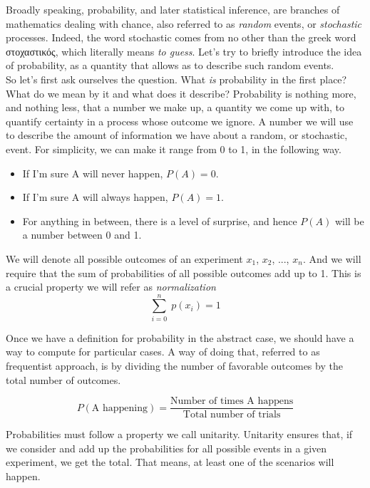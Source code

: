 \documentclass{book}
\begin{document}
Broadly speaking, probability, and later statistical inference, are branches of mathematics dealing with chance, also referred to as \textit{random} events, or \textit{stochastic} processes. Indeed, the word stochastic comes from no other than the greek word \textgreek{στοχαστικός}, which literally means \textit{to guess}. Let's try to briefly introduce the idea of probability, as a quantity that allows as to describe such random events.\\

So let's first ask ourselves the question. What \textit{is} probability in the first place? What do we mean by it and what does it describe? Probability is nothing more, and nothing less, that a number we make up, a quantity we come up with, to quantify certainty in a process whose outcome we ignore. A number we will use to describe the amount of information we have about a random, or stochastic, event. For simplicity, we can make it range from 0 to 1, in the following way.

\begin{itemize}
\item If I'm sure A will never happen, $P(A) = 0$.
\item If I'm sure A will always happen,  $P(A) = 1$.
\item For anything in between, there is a level of surprise, and hence $P(A)$ will be a number between 0 and 1.
\end{itemize}

We will denote all possible outcomes of an experiment $x_{1}$, $x_{2}$, ..., $x_{n}$. And we will require that the sum of probabilities of all possible outcomes add up to 1. This is a crucial property we will refer as \textit{normalization}	
\begin{equation}
	\sum_{i = 0}^{n} \; p(x_{i}) = 1
\end{equation}

Once we have a definition for probability in the abstract case, we should have a way to compute for particular cases. A way of doing that, referred to as frequentist approach, is by dividing the number of favorable outcomes by the total number of outcomes.

\begin{equation}
	P(\text{A happening}) = \frac{\text{Number of times A happens}}{\text{Total number of trials}}
\end{equation}

Probabilities must follow a property we call unitarity. Unitarity ensures that, if we consider and add up the probabilities for all possible events in a given experiment, we get the total. That means, at least one of the scenarios will happen.\\
\end{document}
